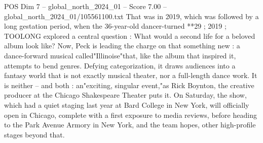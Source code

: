 \begin{textsample}{POS Dim 7 – global\_north\_2024\_01 – Score 7.00 – global\_north\_2024\_01/105561100.txt}
That was in 2019, which was followed by a long gestation period, when the 36-year-old dancer-turned **29 ; 2019 ; TOOLONG explored a central question : What would a second life for a beloved album look like?
Now, Peck is leading the charge on that something new : a dance-forward musical called"Illinoise"that, like the album that inspired it, attempts to bend genres.
Defying categorization, it draws audiences into a fantasy world that is not exactly musical theater, nor a full-length dance work.
It is neither -- and both : an"exciting, singular event,"as Rick Boynton, the creative producer at the Chicago Shakespeare Theater puts it.
On Saturday, the show, which had a quiet staging last year at Bard College in New York, will officially open in Chicago, complete with a first exposure to media reviews, before heading to the Park Avenue Armory in New York, and the team hopes, other high-profile stages beyond that.

\end{textsample}
